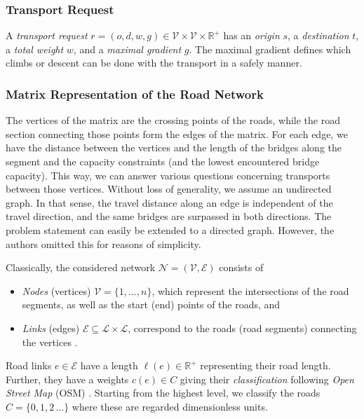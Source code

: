 %


\subsubsection{Transport Request}

A \emph{transport request} $r=(o,d,w,g) \in \mathcal{V} \times \mathcal{V} \times \mathbb{R}^{+}$
has an \emph{origin} $s$, a \emph{destination} $t$, a \emph{total weight} $w$, and
a \emph{maximal gradient} $g$.
The maximal gradient defines which climbs or descent can be done with the transport in a safely manner.

\subsubsection{Matrix Representation of the Road Network}

The vertices of the matrix are the crossing points of the roads, while
the road section connecting those points form the edges of the matrix.
For each edge, we have the distance between the vertices and the length of the bridges along the segment
and the capacity constraints (and the lowest encountered bridge capacity).
This way, we can answer various questions concerning transports between those vertices.
Without loss of generality, we assume an undirected graph.
In that sense, the travel distance along an edge is independent of
the travel direction, and  the same bridges are surpassed in both directions.
The problem statement can
easily be extended to a directed graph. However, the authors omitted this for reasons of simplicity.

Classically,  the considered network $\mathcal{N}=(\mathcal{V},\mathcal{E})$ consists of
\begin{itemize}
  \item \emph{Nodes} (vertices) $\mathcal{V}=\{1,\ldots, n\}$, which represent the intersections of the road segments,
as  well as the start (end) points of the roads, and

  \item \emph{Links} (edges) $\mathcal{E} \subseteq \mathcal{L} \times \mathcal{L}$,
  correspond to the roads (road segments) connecting the vertices \cite{liedtke2012generation}.
\end{itemize}

Road links $e \in \mathcal{E}$ have a length $\ell(e)\in \mathbb{R}^{+}$ representing their road length.
Further, they have a weights $c(e) \in C$ giving their \emph{classification} following \textit{Open Street Map} (OSM) \cite{OpenStreetMap}. Starting from the highest level, we classify the roads
$C=\{0,1,2\,\ldots\}$ where these are regarded dimensionless units.

